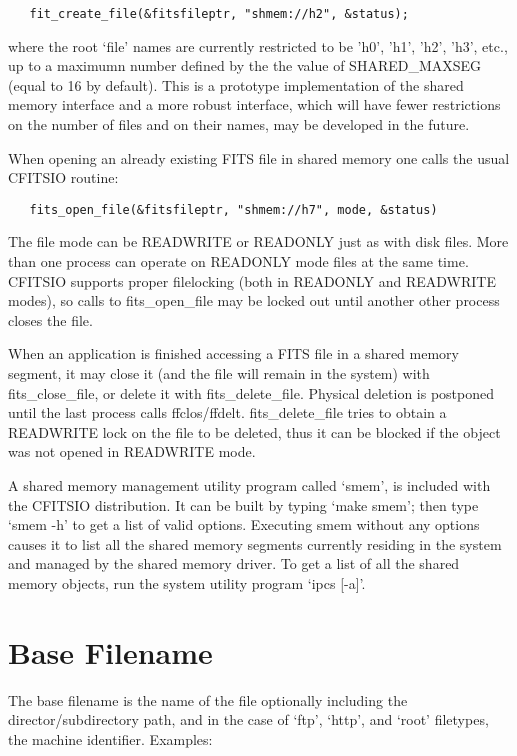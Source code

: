 \documentclass[11pt]{book}
\begin{document}
\begin{verbatim}
   fit_create_file(&fitsfileptr, "shmem://h2", &status);
\end{verbatim}
where the root `file' names are currently restricted to be 'h0', 'h1',
'h2', 'h3', etc., up to a maximumn number defined by the the value of
SHARED\_MAXSEG (equal to 16 by default).  This is a prototype
implementation of the shared memory interface and a more robust
interface, which will have fewer restrictions on the number of files
and on their names, may be developed in the future.

When opening an already existing FITS file in shared memory one calls
the usual CFITSIO routine:

\begin{verbatim}
   fits_open_file(&fitsfileptr, "shmem://h7", mode, &status)
\end{verbatim}
The file mode can be READWRITE or READONLY just as with disk files.
More than one process can operate on READONLY mode files at the same
time.  CFITSIO supports proper filelocking (both in READONLY and
READWRITE modes), so calls to fits\_open\_file may be locked out until
another other process closes the file.

When an application is finished accessing a FITS file in a shared
memory segment, it may close it  (and the file will remain in the
system) with fits\_close\_file, or delete it with fits\_delete\_file.
Physical deletion is postponed until the last process calls
ffclos/ffdelt.  fits\_delete\_file tries to obtain a READWRITE lock on
the file to be deleted, thus it can be blocked if the object was not
opened in READWRITE mode.

A shared memory management utility program called `smem', is included
with the CFITSIO distribution.  It can be built by typing `make smem';
then type `smem -h' to get a list of valid options.  Executing smem
without any options causes it to list all the shared memory segments
currently residing in the system and managed by the shared memory
driver. To get a list of all the shared memory objects, run the system
utility program `ipcs  [-a]'.


\section{Base Filename}

The base filename is the name of the file optionally including the
director/subdirectory path, and in the case of `ftp', `http', and `root'
filetypes, the machine identifier.  Examples:
\end{document}
